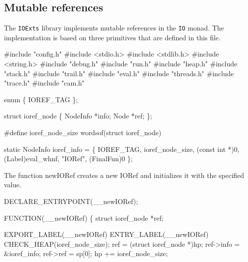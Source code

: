 %
%
\subsection{Mutable references}
The \texttt{IOExts} library implements mutable references in the
\texttt{IO} monad. The implementation is based on three primitives
that are defined in this file.

\nwenddocs{}\endmoddef\nwstartdeflinemarkup{}\nwenddeflinemarkup
#include "config.h"
#include <stdio.h>
#include <stdlib.h>
#include <string.h>
#include "debug.h"
#include "run.h"
#include "heap.h"
#include "stack.h"
#include "trail.h"
#include "eval.h"
#include "threads.h"
#include "trace.h"
#include "cam.h"

enum \{ IOREF_TAG \};

struct ioref_node \{
    NodeInfo *info;
    Node     *ref;
\};

#define ioref_node_size wordsof(struct ioref_node)

static NodeInfo ioref_info = \{
    IOREF_TAG, ioref_node_size, (const int *)0, (Label)eval_whnf, "IORef",
    (FinalFun)0
\};

\nwendcode{}\nwdocspar
The function {\Tt{}newIORef\nwendquote} creates a new {\Tt{}IORef\nwendquote} and initializes it
with the specified value.

\nwenddocs{}\plusendmoddef\nwstartdeflinemarkup{}\nwenddeflinemarkup
DECLARE_ENTRYPOINT(__newIORef);

FUNCTION(__newIORef)
\{
    struct ioref_node *ref;

    EXPORT_LABEL(__newIORef)
 ENTRY_LABEL(__newIORef)
    CHECK_HEAP(ioref_node_size);
    ref       = (struct ioref_node *)hp;
    ref->info = &ioref_info;
    ref->ref  = sp[0];
    hp       += ioref_node_size;
    
